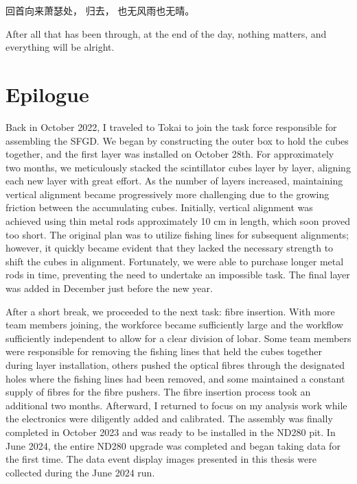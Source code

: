 \begin{savequote}[8cm]
\begin{CJK*}{UTF8}{gbsn}
回首向来萧瑟处，
归去，
也无风雨也无晴。
\end{CJK*}

After all that has been through, at the end of the day, nothing matters, and everything will be alright.

\end{savequote}

\chapter{\label{ch:concl}Epilogue} 

\minitoc

Back in October 2022, I traveled to Tokai to join the task force responsible for assembling the SFGD.
We began by constructing the outer box to hold the cubes together, and the first layer was installed on October 28th.
For approximately two months, we meticulously stacked the scintillator cubes layer by layer, aligning each new layer with great effort.
As the number of layers increased, maintaining vertical alignment became progressively more challenging due to the growing friction between the accumulating cubes.
Initially, vertical alignment was achieved using thin metal rods approximately 10 cm in length, which soon proved too short.
The original plan was to utilize fishing lines for subsequent alignments; however, it quickly became evident that they lacked the necessary strength to shift the cubes in alignment.
Fortunately, we were able to purchase longer metal rods in time, preventing the need to undertake an impossible task.
The final layer was added in December just before the new year.

After a short break, we proceeded to the next task: fibre insertion.
With more team members joining, the workforce became sufficiently large and the workflow sufficiently independent to allow for a clear division of lobar.
Some team members were responsible for removing the fishing lines that held the cubes together during layer installation, others pushed the optical fibres through the designated holes where the fishing lines had been removed, and some maintained a constant supply of fibres for the fibre pushers.
The fibre insertion process took an additional two months.
Afterward, I returned to focus on my analysis work while the electronics were diligently added and calibrated.
The assembly was finally completed in October 2023 and was ready to be installed in the ND280 pit.
In June 2024, the entire ND280 upgrade was completed and began taking data for the first time.
The data event display images presented in this thesis were collected during the June 2024 run.

